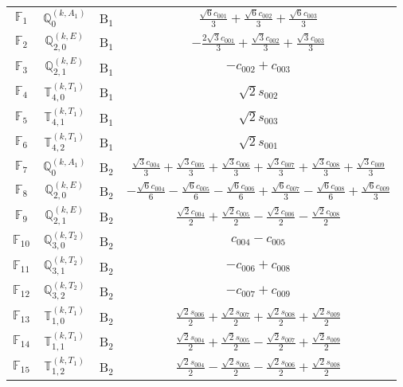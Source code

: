 \documentclass[fleqn,10pt,landscape]{article}
\begin{document}
\begin{itemize}
\begin{center}
\begin{longtable}{c|c|c|c}
$ \mathbb{F}_{1} $ & $\mathbb{Q}_{0}^{(k,A_{1})}$ & B$_{1}$ & $\frac{\sqrt{6} c_{001}}{3} + \frac{\sqrt{6} c_{002}}{3} + \frac{\sqrt{6} c_{003}}{3}$ \\
$ \mathbb{F}_{2} $ & $\mathbb{Q}_{2,0}^{(k,E)}$ & B$_{1}$ & $- \frac{2 \sqrt{3} c_{001}}{3} + \frac{\sqrt{3} c_{002}}{3} + \frac{\sqrt{3} c_{003}}{3}$ \\
$ \mathbb{F}_{3} $ & $\mathbb{Q}_{2,1}^{(k,E)}$ & B$_{1}$ & $- c_{002} + c_{003}$ \\
$ \mathbb{F}_{4} $ & $\mathbb{T}_{4,0}^{(k,T_{1})}$ & B$_{1}$ & $\sqrt{2} s_{002}$ \\
$ \mathbb{F}_{5} $ & $\mathbb{T}_{4,1}^{(k,T_{1})}$ & B$_{1}$ & $\sqrt{2} s_{003}$ \\
$ \mathbb{F}_{6} $ & $\mathbb{T}_{4,2}^{(k,T_{1})}$ & B$_{1}$ & $\sqrt{2} s_{001}$ \\ \hline
$ \mathbb{F}_{7} $ & $\mathbb{Q}_{0}^{(k,A_{1})}$ & B$_{2}$ & $\frac{\sqrt{3} c_{004}}{3} + \frac{\sqrt{3} c_{005}}{3} + \frac{\sqrt{3} c_{006}}{3} + \frac{\sqrt{3} c_{007}}{3} + \frac{\sqrt{3} c_{008}}{3} + \frac{\sqrt{3} c_{009}}{3}$ \\
$ \mathbb{F}_{8} $ & $\mathbb{Q}_{2,0}^{(k,E)}$ & B$_{2}$ & $- \frac{\sqrt{6} c_{004}}{6} - \frac{\sqrt{6} c_{005}}{6} - \frac{\sqrt{6} c_{006}}{6} + \frac{\sqrt{6} c_{007}}{3} - \frac{\sqrt{6} c_{008}}{6} + \frac{\sqrt{6} c_{009}}{3}$ \\
$ \mathbb{F}_{9} $ & $\mathbb{Q}_{2,1}^{(k,E)}$ & B$_{2}$ & $\frac{\sqrt{2} c_{004}}{2} + \frac{\sqrt{2} c_{005}}{2} - \frac{\sqrt{2} c_{006}}{2} - \frac{\sqrt{2} c_{008}}{2}$ \\
$ \mathbb{F}_{10} $ & $\mathbb{Q}_{3,0}^{(k,T_{2})}$ & B$_{2}$ & $c_{004} - c_{005}$ \\
$ \mathbb{F}_{11} $ & $\mathbb{Q}_{3,1}^{(k,T_{2})}$ & B$_{2}$ & $- c_{006} + c_{008}$ \\
$ \mathbb{F}_{12} $ & $\mathbb{Q}_{3,2}^{(k,T_{2})}$ & B$_{2}$ & $- c_{007} + c_{009}$ \\
$ \mathbb{F}_{13} $ & $\mathbb{T}_{1,0}^{(k,T_{1})}$ & B$_{2}$ & $\frac{\sqrt{2} s_{006}}{2} + \frac{\sqrt{2} s_{007}}{2} + \frac{\sqrt{2} s_{008}}{2} + \frac{\sqrt{2} s_{009}}{2}$ \\
$ \mathbb{F}_{14} $ & $\mathbb{T}_{1,1}^{(k,T_{1})}$ & B$_{2}$ & $\frac{\sqrt{2} s_{004}}{2} + \frac{\sqrt{2} s_{005}}{2} - \frac{\sqrt{2} s_{007}}{2} + \frac{\sqrt{2} s_{009}}{2}$ \\
$ \mathbb{F}_{15} $ & $\mathbb{T}_{1,2}^{(k,T_{1})}$ & B$_{2}$ & $\frac{\sqrt{2} s_{004}}{2} - \frac{\sqrt{2} s_{005}}{2} - \frac{\sqrt{2} s_{006}}{2} + \frac{\sqrt{2} s_{008}}{2}$ \\

\end{longtable}
\end{center}
\end{itemize}
\end{document}
